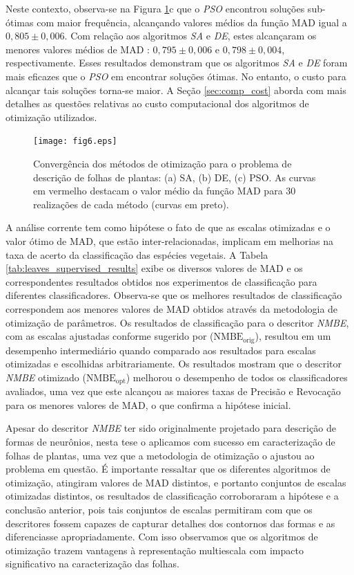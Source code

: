 Neste contexto, observa-se na Figura \ref{fig:converge}c que o \emph{PSO} encontrou soluções sub-ótimas com maior frequência, alcançando valores médios da função MAD  igual a $0,805 \pm 0,006$.  Com relação aos algoritmos \emph{SA} e \emph{DE}, estes alcançaram os menores valores médios de MAD : $0,795 \pm 0,006$ e $0,798 \pm 0,004$, respectivamente. Esses resultados demonstram que os algoritmos \emph{SA} e \emph{DE} foram mais eficazes que o \emph{PSO} em encontrar soluções ótimas. No entanto, o custo para alcançar tais soluções torna-se maior. A Seção \ref{sec:comp_cost} aborda com mais detalhes as questões relativas ao custo computacional dos algoritmos de otimização utilizados.

\begin{figure}[!htb]
\caption{\label{fig:converge} Convergência dos métodos de otimização para o problema de descrição de folhas de plantas: (a) SA, (b) DE, (c) PSO. As curvas em vermelho destacam o valor médio da função MAD para $30$ realizações de cada método (curvas em preto).} 

\texttt{[image: fig6.eps]}
\end{figure}

A análise corrente tem como hipótese o fato de que as escalas otimizadas e o valor ótimo de MAD, que estão inter-relacionadas, implicam em melhorias na taxa de acerto da classificação das espécies vegetais. A Tabela \ref{tab:leaves_supervised_results} exibe os diversos valores de MAD e os correspondentes resultados obtidos nos experimentos de classificação para diferentes classificadores. Observa-se que os melhores resultados de classificação correspondem aos menores valores de MAD obtidos através da metodologia de otimização de parâmetros. Os resultados de classificação para o descritor \emph{NMBE}, com as escalas ajustadas conforme sugerido por  ($\operatorname{NMBE_{orig}}$), resultou em um desempenho intermediário quando comparado aos resultados para escalas otimizadas e escolhidas arbitrariamente. Os resultados mostram que o descritor \emph{NMBE} otimizado ($\operatorname{NMBE_{opt}}$) melhorou o desempenho de todos os classificadores avaliados, uma vez que este alcançou as maiores taxas de Precisão e Revocação para os menores valores de MAD, o que confirma a hipótese inicial.

Apesar do descritor \emph{NMBE} ter sido originalmente projetado para descrição de formas de neurônios, nesta tese o aplicamos com sucesso em caracterização de folhas de plantas, uma vez que a metodologia de otimização o ajustou ao problema em questão.
É importante ressaltar que os diferentes algoritmos de otimização, atingiram valores de MAD distintos, e portanto conjuntos de escalas otimizadas distintos, os resultados de classificação corroboraram a hipótese e a conclusão anterior, pois tais conjuntos de escalas  permitiram com que os descritores fossem capazes de capturar detalhes dos contornos das formas e as diferenciasse apropriadamente. Com isso observamos que os algoritmos de otimização trazem vantagens à representação multiescala com impacto significativo na caracterização das folhas. 

